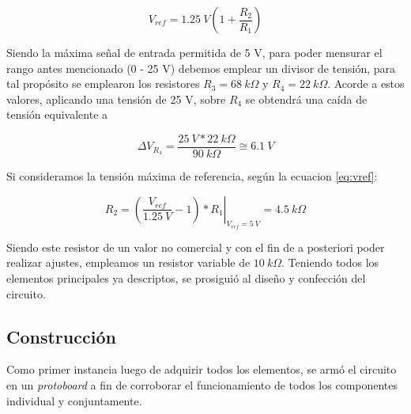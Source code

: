 \documentclass[12pt,a4paper]{article}
\begin{document}
		\begin{equation}\label{eq:vref}
			V_{ref} = 1.25 \: V (1+\frac{R_2}{R_1})
		\end{equation}

		Siendo la máxima señal de entrada permitida de 5 V, para poder mensurar el rango antes mencionado (0 - 25 V) debemos emplear un divisor de tensión, para tal propósito se emplearon los resistores $R_3 = 68 \: k\Omega$ y $R_4 = 22 \: k\Omega$. Acorde a estos valores, aplicando una tensión de 25 V, sobre $R_4$ se obtendrá una caída de tensión equivalente a

		\begin{equation}
			\Delta V_{R_4} = \frac{25 \: V * 22 \: k\Omega}{90 \: k\Omega} \cong 6.1 \: V
		\end{equation}

		Si consideramos la tensión máxima de referencia, según la ecuacion \ref{eq:vref}:

		\begin{equation}
			\displaystyle R_2 = \left.  \left ( \frac{V_{ref}}{1.25 \: V}-1 \right ) * R_1 \right |_{V_{ref} = 5 \: V} = 4.5 \: k\Omega
		\end{equation}

		Siendo este resistor de un valor no comercial y con el fin de a posteriori poder realizar ajustes, empleamos un resistor variable de $10 \: k\Omega$. Teniendo todos los elementos principales ya descriptos, se prosiguió al diseño y confección del circuito.



		\subsection{Construcción}

			Como primer instancia luego de adquirir todos los elementos, se armó el circuito en un \textit{protoboard} a fin de corroborar el funcionamiento de todos los componentes individual y conjuntamente.
\end{document}
